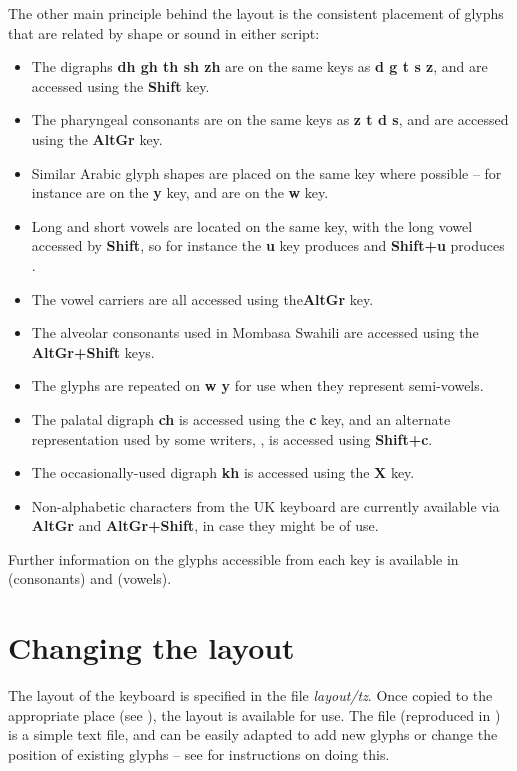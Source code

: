 The other main principle behind the layout is the consistent placement of glyphs that are related by shape or sound in either script:
\begin{itemize}
\item The digraphs \textbf{dh gh th sh zh} are on the same keys as \textbf{d g t s z}, and are accessed using the \textbf{Shift} key.
\item The pharyngeal consonants  are on the same keys as \textbf{z t d s}, and are accessed using the \textbf{AltGr} key.
\item Similar Arabic glyph shapes are placed on the same key where possible -- for instance  are on the \textbf{y} key, and  are on the \textbf{w} key.
\item Long and short vowels are located on the same key, with the long vowel accessed by \textbf{Shift}, so for instance the \textbf{u} key produces  and \textbf{Shift+u} produces .
\item The vowel carriers  are all accessed using the\textbf{AltGr} key.
\item The alveolar consonants  used in Mombasa Swahili are accessed using the \textbf{AltGr+Shift} keys.
\item The glyphs  are repeated on \textbf{w y} for use when they represent semi-vowels.
\item The palatal digraph \textbf{ch} is accessed using the \textbf{c} key, and an alternate representation used by some writers, , is accessed using \textbf{Shift+c}.
\item The occasionally-used digraph \textbf{kh} is accessed using the \textbf{X} key.
\item Non-alphabetic characters from the UK keyboard are currently available via \textbf{AltGr} and \textbf{AltGr+Shift}, in case they might be of use.
\end{itemize}

Further information on the glyphs accessible from each key is available in  (consonants) and  (vowels).

\section{Changing the layout}
\label{s:changelayout}

The layout of the keyboard is specified in the file \textit{layout/tz}.  Once copied to the appropriate place (see ), the layout is available for use.  The file (reproduced in ) is a simple text file, and can be easily adapted to add new glyphs or change the position of existing glyphs -- see  for instructions on doing this.

